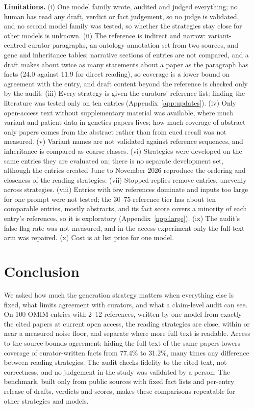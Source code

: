 \documentclass{article} %
\begin{document}
\textbf{Limitations.} (i) One model family wrote, audited and judged everything; no human has read any draft, verdict or fact judgement, so no judge is validated, and no second model family was tested, so whether the strategies stay close for other models is unknown. (ii) The reference is indirect and narrow: variant-centred curator paragraphs, an ontology annotation set from two sources, and gene and inheritance tables; narrative sections of entries are not compared, and a draft makes about twice as many statements about a paper as the paragraph has facts (24.0 against 11.9 for direct reading), so coverage is a lower bound on agreement with the entry, and draft content beyond the reference is checked only by the audit. (iii) Every strategy is given the curators' reference list; finding the literature was tested only on ten entries (Appendix~\ref{app:updates}). (iv) Only open-access text without supplementary material was available, where much variant and patient data in genetics papers lives; how much coverage of abstract-only papers comes from the abstract rather than from cued recall was not measured. (v) Variant names are not validated against reference sequences, and inheritance is compared as coarse classes. (vi) Strategies were developed on the same entries they are evaluated on; there is no separate development set, although the entries created June to November 2026 reproduce the ordering and closeness of the reading strategies. (vii) Stopped replies remove entries, unevenly across strategies. (viii) Entries with few references dominate and inputs too large for one prompt were not tested; the 30--75-reference tier has about ten comparable entries, mostly abstracts, and its fact score covers a minority of each entry's references, so it is exploratory (Appendix~\ref{app:large}). (ix) The audit's false-flag rate was not measured, and in the access experiment only the full-text arm was repaired. (x) Cost is at list price for one model.

\section{Conclusion}
\label{sec:conclusion}
We asked how much the generation strategy matters when everything else is fixed, what limits agreement with curators, and what a claim-level audit can see. On 100 OMIM entries with 2--12 references, written by one model from exactly the cited papers at current open access, the reading strategies are close, within or near a measured noise floor, and separate where more full text is readable. Access to the source bounds agreement: hiding the full text of the same papers lowers coverage of curator-written facts from 77.4\% to 31.2\%, many times any difference between reading strategies. The audit checks fidelity to the cited text, not correctness, and no judgement in the study was validated by a person. The benchmark, built only from public sources with fixed fact lists and per-entry release of drafts, verdicts and scores, makes these comparisons repeatable for other strategies and models.
\end{document}
